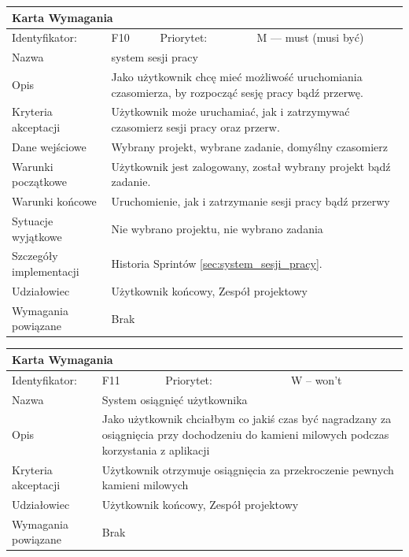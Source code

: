 \documentclass[a4paper,11pt]{report}
\begin{document}
		\begin{tabular}{|p{3cm}|p{2cm}|p{2cm}|p{6cm}|}
		\hline
		\multicolumn{4}{|p{12 cm}|}{Karta Wymagania}\\
		\hline
		Identyfikator: & F10 & Priorytet: & M — must (musi być)\\
		\hline
		Nazwa & \multicolumn{3}{|p{10 cm}|}{system sesji pracy}\\
		\hline
		Opis & \multicolumn{3}{|p{10 cm}|}{Jako użytkownik chcę mieć możliwość uruchomiania czasomierza, by rozpocząć sesję pracy bądź przerwę.}\\
		\hline
		Kryteria akceptacji & \multicolumn{3}{|p{10 cm}|}{Użytkownik może uruchamiać, jak i zatrzymywać czasomierz sesji pracy oraz przerw.}\\
		\hline
		Dane wejściowe & \multicolumn{3}{|p{10 cm}|}{Wybrany projekt, wybrane zadanie, domyślny czasomierz}\\
		\hline
		Warunki początkowe & \multicolumn{3}{|p{10 cm}|}{Użytkownik jest zalogowany, został wybrany projekt bądź zadanie.}\\
		\hline
		Warunki końcowe & \multicolumn{3}{|p{10 cm}|}{Uruchomienie, jak i zatrzymanie sesji pracy bądź przerwy}\\
		\hline
		Sytuacje wyjątkowe & \multicolumn{3}{|p{10 cm}|}{Nie wybrano projektu, nie wybrano zadania}\\
		\hline
		Szczegóły implementacji & \multicolumn{3}{|p{10 cm}|}{Historia Sprintów \ref{sec:system_sesji_pracy}.}\\
		\hline
		Udziałowiec & \multicolumn{3}{|p{10 cm}|}{Użytkownik końcowy, Zespół projektowy}\\
		\hline
		Wymagania powiązane & \multicolumn{3}{|p{10 cm}|}{Brak}\\
		\hline
		\end{tabular}
		\newline
		\vspace*{0,2 cm}
		\newline
		\begin{tabular}{|p{3cm}|p{2cm}|p{2cm}|p{6cm}|}
		\hline
		\multicolumn{4}{|p{12 cm}|}{Karta Wymagania}\\
		\hline
		Identyfikator: & F11 & Priorytet: & W – won't \\
		\hline
		Nazwa & \multicolumn{3}{|p{10 cm}|}{System osiągnięć użytkownika}\\
		\hline
		Opis & \multicolumn{3}{|p{10 cm}|}{Jako użytkownik chciałbym co jakiś czas być nagradzany za osiągnięcia przy dochodzeniu do kamieni milowych podczas korzystania z aplikacji}\\
		\hline
		Kryteria akceptacji & \multicolumn{3}{|p{10 cm}|}{Użytkownik otrzymuje osiągnięcia za przekroczenie pewnych kamieni milowych}\\
		\hline
		Udziałowiec & \multicolumn{3}{|p{10 cm}|}{Użytkownik końcowy, Zespół projektowy}\\
		\hline
		Wymagania powiązane & \multicolumn{3}{|p{10 cm}|}{Brak}\\
		\hline
		\end{tabular}
\end{document}
